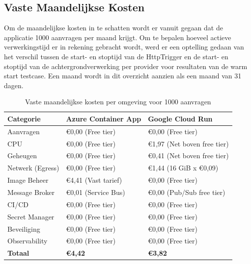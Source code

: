 \subsection{Vaste Maandelijkse Kosten}

Om de maandelijkse kosten in te schatten wordt er vanuit gegaan dat de applicatie 1000 aanvragen per maand krijgt. Om te bepalen hoeveel actieve verwerkingstijd er in rekening gebracht wordt, werd er een optelling gedaan van het verschil tussen de start- en stoptijd van de HttpTrigger en de start- en stoptijd van de achtergrondverwerking per provider voor resultaten van de warm start testcase. Een maand wordt in dit overzicht aanzien als een maand van 31 dagen.

\begin{table}[H]
    \centering
    \caption{Vaste maandelijkse kosten per omgeving voor 1000 aanvragen}
    \label{tab:maandelijkse-kost}
    \begin{tabular}{|l|l|l|}
        \hline
        \textbf{Categorie} & \textbf{Azure Container App} & \textbf{Google Cloud Run} \\ \hline
        Aanvragen & €0,00 (Free tier) & €0,00 (Free tier) \\ \hline
        CPU & €0,00 (Free tier) & €1,97 (Net boven free tier) \\ \hline
        Geheugen & €0,00 (Free tier) & €0,41 (Net boven free tier) \\ \hline
        Netwerk (Egress) & €0,00 (Free tier) & €1,44 (16 GiB x €0,09) \\ \hline
        Image Beheer & €4,41 (Vast tarief) & €0,00 (Free tier) \\ \hline
        Message Broker & €0,01 (Service Bus) & €0,00 (Pub/Sub free tier) \\ \hline
        CI/CD & €0,00 (Free tier) & €0,00 (Free tier) \\ \hline
        Secret Manager & €0,00 (Free tier) & €0,00 (Free tier) \\ \hline
        Beveiliging & €0,00 (Free tier) & €0,00 (Free tier) \\ \hline
        Observability & €0,00 (Free tier) & €0,00 (Free tier) \\ \hline \hline
        \textbf{Totaal} & \textbf{€4,42} & \textbf{€3,82} \\ \hline
    \end{tabular}
\end{table}

